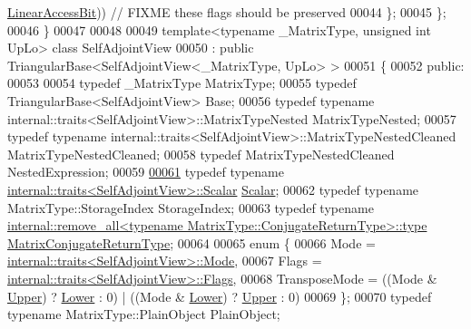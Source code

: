 \begin{DoxyCode}
      \hyperlink{group__flags_ga4b983a15d57cd55806df618ac544d09e}{LinearAccessBit})) \textcolor{comment}{// FIXME these flags should be preserved}
00044   \};
00045 \};
00046 \}
00047 
00048 
00049 \textcolor{keyword}{template}<\textcolor{keyword}{typename} \_MatrixType, \textcolor{keywordtype}{unsigned} \textcolor{keywordtype}{int} UpLo> \textcolor{keyword}{class }SelfAdjointView
00050   : \textcolor{keyword}{public} TriangularBase<SelfAdjointView<\_MatrixType, UpLo> >
00051 \{
00052   \textcolor{keyword}{public}:
00053 
00054     \textcolor{keyword}{typedef} \_MatrixType MatrixType;
00055     \textcolor{keyword}{typedef} TriangularBase<SelfAdjointView> Base;
00056     \textcolor{keyword}{typedef} \textcolor{keyword}{typename} internal::traits<SelfAdjointView>::MatrixTypeNested MatrixTypeNested;
00057     \textcolor{keyword}{typedef} \textcolor{keyword}{typename} internal::traits<SelfAdjointView>::MatrixTypeNestedCleaned MatrixTypeNestedCleaned;
00058     \textcolor{keyword}{typedef} MatrixTypeNestedCleaned NestedExpression;
00059 
\hyperlink{group___core___module_af52acc0942ece2de9b6db4a99cc6656e}{00061}     \textcolor{keyword}{typedef} \textcolor{keyword}{typename} \hyperlink{struct_eigen_1_1internal_1_1traits}{internal::traits<SelfAdjointView>::Scalar} 
      \hyperlink{group___core___module_af52acc0942ece2de9b6db4a99cc6656e}{Scalar}; 
00062     \textcolor{keyword}{typedef} \textcolor{keyword}{typename} MatrixType::StorageIndex StorageIndex;
00063     \textcolor{keyword}{typedef} \textcolor{keyword}{typename} 
      \hyperlink{group___sparse_core___module}{internal::remove\_all<typename MatrixType::ConjugateReturnType>::type}
       \hyperlink{group___sparse_core___module}{MatrixConjugateReturnType};
00064 
00065     \textcolor{keyword}{enum} \{
00066       Mode = \hyperlink{struct_eigen_1_1internal_1_1traits}{internal::traits<SelfAdjointView>::Mode},
00067       Flags = \hyperlink{struct_eigen_1_1internal_1_1traits}{internal::traits<SelfAdjointView>::Flags},
00068       TransposeMode = ((Mode & \hyperlink{group__enums_gga39e3366ff5554d731e7dc8bb642f83cda6bcb58be3b8b8ec84859ce0c5ac0aaec}{Upper}) ? \hyperlink{group__enums_gga39e3366ff5554d731e7dc8bb642f83cda891792b8ed394f7607ab16dd716f60e6}{Lower} : 0) | ((Mode & \hyperlink{group__enums_gga39e3366ff5554d731e7dc8bb642f83cda891792b8ed394f7607ab16dd716f60e6}{Lower}) ? 
      \hyperlink{group__enums_gga39e3366ff5554d731e7dc8bb642f83cda6bcb58be3b8b8ec84859ce0c5ac0aaec}{Upper} : 0)
00069     \};
00070     \textcolor{keyword}{typedef} \textcolor{keyword}{typename} MatrixType::PlainObject PlainObject;

\end{DoxyCode}
